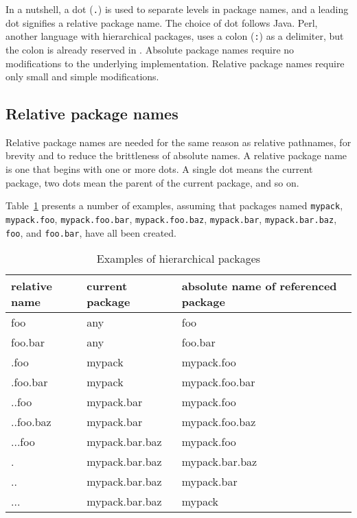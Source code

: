 In a nutshell, a dot (\verb|.|) is used to separate levels in package
names, and a leading dot signifies a relative package name. The choice
of dot follows Java. Perl, another language with hierarchical
packages, uses a colon (\verb|:|) as a delimiter, but the colon is
already reserved in \clisp{}. Absolute package names require no
modifications to the underlying \clisp{} implementation. Relative
package names require only small and simple modifications.


\subsection{Relative package names}

Relative package names are needed for the same reason as relative
pathnames, for brevity and to reduce the brittleness of absolute
names. A relative package name is one that begins with one or more
dots. A single dot means the current package, two dots mean the parent
of the current package, and so on.

Table~\ref{tbl:hierarchical-packages} presents a number of examples,
assuming that packages named \verb|mypack|, \verb|mypack.foo|,
\verb|mypack.foo.bar|, \verb|mypack.foo.baz|, \verb|mypack.bar|,
\verb|mypack.bar.baz|, \verb|foo|, and \verb|foo.bar|, have all been
created.

\begin{table}[h]
\begin{center}
\begin{tabular}{|l|l|l|}
\hline
relative name   &  current package & absolute name of referenced package \\
\hline
foo &               any  &                      foo \\
foo.bar &           any &                       foo.bar \\
.foo &              mypack &                    mypack.foo \\
 .foo.bar &         mypack &                    mypack.foo.bar \\
 ..foo &            mypack.bar &                mypack.foo \\
 ..foo.baz &        mypack.bar &                mypack.foo.baz \\
 ...foo &           mypack.bar.baz &            mypack.foo \\
 . &                mypack.bar.baz &            mypack.bar.baz \\
 .. &               mypack.bar.baz &            mypack.bar \\
 ... &              mypack.bar.baz &            mypack \\
\hline
\end{tabular}
\end{center}
\caption{Examples of hierarchical packages}
\label{tbl:hierarchical-packages}
\end{table}

